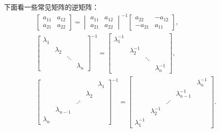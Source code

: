 \begin{example}
下面看一些常见矩阵的逆矩阵：\begin{gather*}
	\begin{bmatrix}
		a_{11} & a_{12} \\
		a_{21} & a_{22}
	\end{bmatrix}
	= \begin{vmatrix}
		a_{11} & a_{12} \\
		a_{21} & a_{22}
	\end{vmatrix}^{-1}
	\begin{bmatrix}
		a_{22} & -a_{12} \\
		-a_{21} & a_{11}
	\end{bmatrix}, \\
	\begin{bmatrix}
		\lambda_1 \\
		& \lambda_2 \\
		&& \ddots \\
		&&& \lambda_n
	\end{bmatrix}^{-1}
	= \begin{bmatrix}
		\lambda_1^{-1} \\
		& \lambda_2^{-1} \\
		&& \ddots \\
		&&& \lambda_n^{-1}
	\end{bmatrix}, \\
	\begin{bmatrix}
		& & & & \lambda_1 \\
		& & & \lambda_2 \\
		& & \iddots \\
		& \lambda_{n-1} \\
		\lambda_n
	\end{bmatrix}^{-1}
	= \begin{bmatrix}
		& & & & \lambda_n^{-1} \\
		& & & \lambda_{n-1}^{-1} \\
		& & \iddots \\
		& \lambda_2^{-1} \\
		\lambda_1^{-1}
	\end{bmatrix}.
\end{gather*}
\end{example}

